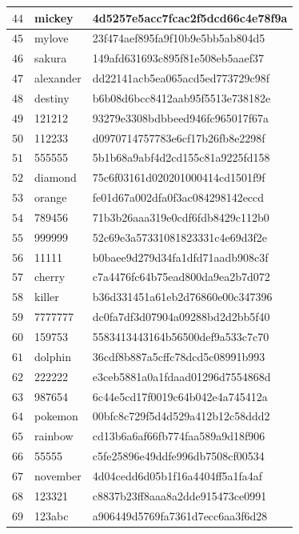 \begin{longtable}{|l|l|l|}
    $44$ & mickey & 4d5257e5acc7fcac2f5dcd66c4e78f9a \\ \hline
    $45$ & mylove & 23f474aef895fa9f10b9e5bb5ab804d5 \\ \hline
    $46$ & sakura & 149afd631693c895f81e508eb5aaef37 \\ \hline
    $47$ & alexander & dd22141acb5ea065acd5ed773729c98f \\ \hline
    $48$ & destiny & b6b08d6bcc8412aab95f5513e738182e \\ \hline
    $49$ & 121212 & 93279e3308bdbbeed946fc965017f67a \\ \hline
    $50$ & 112233 & d0970714757783e6cf17b26fb8e2298f \\ \hline
    $51$ & 555555 & 5b1b68a9abf4d2cd155c81a9225fd158 \\ \hline
    $52$ & diamond & 75c6f03161d020201000414cd1501f9f \\ \hline
    $53$ & orange & fe01d67a002dfa0f3ac084298142eccd \\ \hline
    $54$ & 789456 & 71b3b26aaa319e0cdf6fdb8429c112b0 \\ \hline
    $55$ & 999999 & 52c69e3a57331081823331c4e69d3f2e \\ \hline
    $56$ & 11111 & b0baee9d279d34fa1dfd71aadb908c3f \\ \hline
    $57$ & cherry & c7a4476fc64b75ead800da9ea2b7d072 \\ \hline
    $58$ & killer & b36d331451a61eb2d76860e00c347396 \\ \hline
    $59$ & 7777777 & dc0fa7df3d07904a09288bd2d2bb5f40 \\ \hline
    $60$ & 159753 & 5583413443164b56500def9a533c7c70 \\ \hline
    $61$ & dolphin & 36cdf8b887a5cffc78dcd5c08991b993 \\ \hline
    $62$ & 222222 & e3ceb5881a0a1fdaad01296d7554868d \\ \hline
    $63$ & 987654 & 6c44e5cd17f0019c64b042e4a745412a \\ \hline
    $64$ & pokemon & 00bfc8c729f5d4d529a412b12c58ddd2 \\ \hline
    $65$ & rainbow & cd13b6a6af66fb774faa589a9d18f906 \\ \hline
    $66$ & 55555 & c5fe25896e49ddfe996db7508cf00534 \\ \hline
    $67$ & november & 4d04cedd6d05b1f16a4404ff5a1fa4af \\ \hline
    $68$ & 123321 & c8837b23ff8aaa8a2dde915473ce0991 \\ \hline
    $69$ & 123abc & a906449d5769fa7361d7ecc6aa3f6d28 \\ \hline

\end{longtable}
